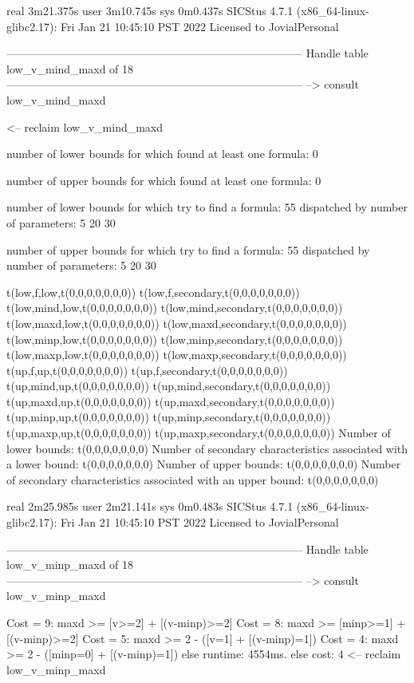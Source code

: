 real	3m21.375s
user	3m10.745s
sys	0m0.437s
SICStus 4.7.1 (x86_64-linux-glibc2.17): Fri Jan 21 10:45:10 PST 2022
Licensed to JovialPersonal


--------------------------------------------------------------------------------
Handle table low_v_mind_maxd of 18
--------------------------------------------------------------------------------
--> consult low_v_mind_maxd

<-- reclaim low_v_mind_maxd

number of lower bounds for which found at least one formula: 0

number of upper bounds for which found at least one formula: 0

number of lower bounds for which try to find a formula: 55
dispatched by number of parameters: 5  20  30

number of upper bounds for which try to find a formula: 55
dispatched by number of parameters: 5  20  30

t(low,f,low,t(0,0,0,0,0,0,0))
t(low,f,secondary,t(0,0,0,0,0,0,0))
t(low,mind,low,t(0,0,0,0,0,0,0))
t(low,mind,secondary,t(0,0,0,0,0,0,0))
t(low,maxd,low,t(0,0,0,0,0,0,0))
t(low,maxd,secondary,t(0,0,0,0,0,0,0))
t(low,minp,low,t(0,0,0,0,0,0,0))
t(low,minp,secondary,t(0,0,0,0,0,0,0))
t(low,maxp,low,t(0,0,0,0,0,0,0))
t(low,maxp,secondary,t(0,0,0,0,0,0,0))
t(up,f,up,t(0,0,0,0,0,0,0))
t(up,f,secondary,t(0,0,0,0,0,0,0))
t(up,mind,up,t(0,0,0,0,0,0,0))
t(up,mind,secondary,t(0,0,0,0,0,0,0))
t(up,maxd,up,t(0,0,0,0,0,0,0))
t(up,maxd,secondary,t(0,0,0,0,0,0,0))
t(up,minp,up,t(0,0,0,0,0,0,0))
t(up,minp,secondary,t(0,0,0,0,0,0,0))
t(up,maxp,up,t(0,0,0,0,0,0,0))
t(up,maxp,secondary,t(0,0,0,0,0,0,0))
Number of lower bounds:                                             t(0,0,0,0,0,0,0)
Number of secondary characteristics associated with a lower bound:  t(0,0,0,0,0,0,0)
Number of upper bounds:                                             t(0,0,0,0,0,0,0)
Number of secondary characteristics associated with an upper bound: t(0,0,0,0,0,0,0)

real	2m25.985s
user	2m21.141s
sys	0m0.483s
SICStus 4.7.1 (x86_64-linux-glibc2.17): Fri Jan 21 10:45:10 PST 2022
Licensed to JovialPersonal


--------------------------------------------------------------------------------
Handle table low_v_minp_maxd of 18
--------------------------------------------------------------------------------
--> consult low_v_minp_maxd

Cost =  9:  maxd >= [v>=2] + [(v-minp)>=2]
Cost =  8:  maxd >= [minp>=1] + [(v-minp)>=2]
Cost =  5:  maxd >= 2 - ([v=1] + [(v-minp)=1])
Cost =  4:  maxd >= 2 - ([minp=0] + [(v-minp)=1])
else runtime: 4554ms. else cost: 4
<-- reclaim low_v_minp_maxd

